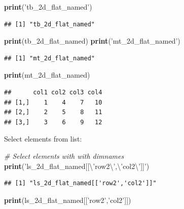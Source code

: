 \documentclass[
]{book}
\newenvironment{Shaded}{\begin{snugshade}}{\end{snugshade}}
\newcommand{\CharTok}[1]{\textcolor[rgb]{0.31,0.60,0.02}{#1}}
\newcommand{\CommentTok}[1]{\textcolor[rgb]{0.56,0.35,0.01}{\textit{#1}}}
\newcommand{\KeywordTok}[1]{\textcolor[rgb]{0.13,0.29,0.53}{\textbf{#1}}}
\newcommand{\NormalTok}[1]{#1}
\newcommand{\StringTok}[1]{\textcolor[rgb]{0.31,0.60,0.02}{#1}}
\begin{document}
\begin{Shaded}
\begin{Highlighting}[]
\KeywordTok{print}\NormalTok{(}\StringTok{'tb_2d_flat_named'}\NormalTok{)}
\end{Highlighting}
\end{Shaded}

\begin{verbatim}
## [1] "tb_2d_flat_named"
\end{verbatim}

\begin{Shaded}
\begin{Highlighting}[]
\KeywordTok{print}\NormalTok{(tb_2d_flat_named)}
\KeywordTok{print}\NormalTok{(}\StringTok{'mt_2d_flat_named'}\NormalTok{)}
\end{Highlighting}
\end{Shaded}

\begin{verbatim}
## [1] "mt_2d_flat_named"
\end{verbatim}

\begin{Shaded}
\begin{Highlighting}[]
\KeywordTok{print}\NormalTok{(mt_2d_flat_named)}
\end{Highlighting}
\end{Shaded}

\begin{verbatim}
##      col1 col2 col3 col4
## [1,]    1    4    7   10
## [2,]    2    5    8   11
## [3,]    3    6    9   12
\end{verbatim}

Select elements from list:

\begin{Shaded}
\begin{Highlighting}[]
\CommentTok{# Select elements with with dimnames}
\KeywordTok{print}\NormalTok{(}\StringTok{'ls_2d_flat_named[[}\CharTok{\textbackslash{}'}\StringTok{row2}\CharTok{\textbackslash{}'}\StringTok{,}\CharTok{\textbackslash{}'}\StringTok{col2}\CharTok{\textbackslash{}'}\StringTok{]]'}\NormalTok{)}
\end{Highlighting}
\end{Shaded}

\begin{verbatim}
## [1] "ls_2d_flat_named[['row2','col2']]"
\end{verbatim}

\begin{Shaded}
\begin{Highlighting}[]
\KeywordTok{print}\NormalTok{(ls_2d_flat_named[[}\StringTok{'row2'}\NormalTok{,}\StringTok{'col2'}\NormalTok{]])}
\end{Highlighting}
\end{Shaded}
\end{document}
